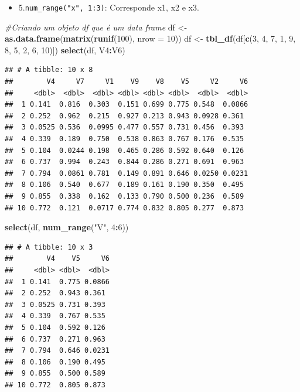 \documentclass[]{book}
\newenvironment{Shaded}{\begin{snugshade}}{\end{snugshade}}
\newcommand{\CommentTok}[1]{\textcolor[rgb]{0.56,0.35,0.01}{\textit{#1}}}
\newcommand{\DataTypeTok}[1]{\textcolor[rgb]{0.13,0.29,0.53}{#1}}
\newcommand{\DecValTok}[1]{\textcolor[rgb]{0.00,0.00,0.81}{#1}}
\newcommand{\KeywordTok}[1]{\textcolor[rgb]{0.13,0.29,0.53}{\textbf{#1}}}
\newcommand{\NormalTok}[1]{#1}
\newcommand{\OperatorTok}[1]{\textcolor[rgb]{0.81,0.36,0.00}{\textbf{#1}}}
\newcommand{\StringTok}[1]{\textcolor[rgb]{0.31,0.60,0.02}{#1}}
\providecommand{\tightlist}{%
  \setlength{\itemsep}{0pt}\setlength{\parskip}{0pt}}
\begin{document}
\begin{itemize}
\tightlist
\item
  5.\texttt{num\_range("x",\ 1:3)}: Corresponde x1, x2 e x3.
\end{itemize}

\begin{Shaded}
\begin{Highlighting}[]
\CommentTok{#Criando um objeto df que é um data frame}
\NormalTok{df <-}\StringTok{ }\KeywordTok{as.data.frame}\NormalTok{(}\KeywordTok{matrix}\NormalTok{(}\KeywordTok{runif}\NormalTok{(}\DecValTok{100}\NormalTok{), }\DataTypeTok{nrow =} \DecValTok{10}\NormalTok{)) }
\NormalTok{df <-}\StringTok{ }\KeywordTok{tbl_df}\NormalTok{(df[}\KeywordTok{c}\NormalTok{(}\DecValTok{3}\NormalTok{, }\DecValTok{4}\NormalTok{, }\DecValTok{7}\NormalTok{, }\DecValTok{1}\NormalTok{, }\DecValTok{9}\NormalTok{, }\DecValTok{8}\NormalTok{, }\DecValTok{5}\NormalTok{, }\DecValTok{2}\NormalTok{, }\DecValTok{6}\NormalTok{, }\DecValTok{10}\NormalTok{)])}
\KeywordTok{select}\NormalTok{(df, V4}\OperatorTok{:}\NormalTok{V6)}
\end{Highlighting}
\end{Shaded}

\begin{verbatim}
## # A tibble: 10 x 8
##        V4     V7     V1    V9    V8    V5     V2     V6
##     <dbl>  <dbl>  <dbl> <dbl> <dbl> <dbl>  <dbl>  <dbl>
##  1 0.141  0.816  0.303  0.151 0.699 0.775 0.548  0.0866
##  2 0.252  0.962  0.215  0.927 0.213 0.943 0.0928 0.361 
##  3 0.0525 0.536  0.0995 0.477 0.557 0.731 0.456  0.393 
##  4 0.339  0.189  0.750  0.538 0.863 0.767 0.176  0.535 
##  5 0.104  0.0244 0.198  0.465 0.286 0.592 0.640  0.126 
##  6 0.737  0.994  0.243  0.844 0.286 0.271 0.691  0.963 
##  7 0.794  0.0861 0.781  0.149 0.891 0.646 0.0250 0.0231
##  8 0.106  0.540  0.677  0.189 0.161 0.190 0.350  0.495 
##  9 0.855  0.338  0.162  0.133 0.790 0.500 0.236  0.589 
## 10 0.772  0.121  0.0717 0.774 0.832 0.805 0.277  0.873
\end{verbatim}

\begin{Shaded}
\begin{Highlighting}[]
\KeywordTok{select}\NormalTok{(df, }\KeywordTok{num_range}\NormalTok{(}\StringTok{"V"}\NormalTok{, }\DecValTok{4}\OperatorTok{:}\DecValTok{6}\NormalTok{))}
\end{Highlighting}
\end{Shaded}

\begin{verbatim}
## # A tibble: 10 x 3
##        V4    V5     V6
##     <dbl> <dbl>  <dbl>
##  1 0.141  0.775 0.0866
##  2 0.252  0.943 0.361 
##  3 0.0525 0.731 0.393 
##  4 0.339  0.767 0.535 
##  5 0.104  0.592 0.126 
##  6 0.737  0.271 0.963 
##  7 0.794  0.646 0.0231
##  8 0.106  0.190 0.495 
##  9 0.855  0.500 0.589 
## 10 0.772  0.805 0.873
\end{verbatim}
\end{document}
